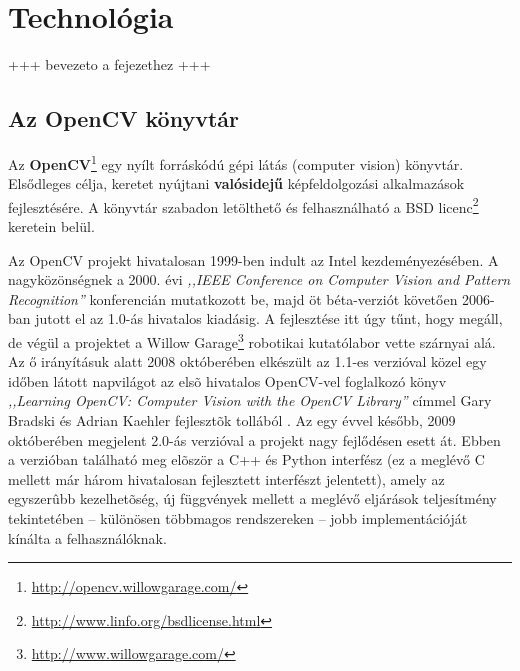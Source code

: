 \chapter{Technológia}\label{sect:technológia}

+++ bevezeto a fejezethez +++

\section{Az OpenCV könyvtár}\label{sect:opencv}

Az \textbf{OpenCV}\footnote{\url{http://opencv.willowgarage.com/}} egy nyílt forráskódú gépi látás (computer vision) könyvtár. Elsődleges célja, keretet nyújtani \textbf{valósidejű} képfeldolgozási alkalmazások fejlesztésére. A könyvtár szabadon letölthető és felhasználható a BSD licenc\footnote{\url{http://www.linfo.org/bsdlicense.html}} keretein belül.

\bigskip

Az OpenCV projekt hivatalosan 1999-ben indult az Intel kezdeményezésében. A nagyközönségnek a 2000. évi \textit{,,IEEE Conference on Computer Vision and Pattern Recognition''} konferencián mutatkozott be, majd öt béta-verziót követően 2006-ban jutott el az 1.0-ás hivatalos kiadásig. A fejlesztése itt úgy tűnt, hogy megáll, de végül a projektet a Willow Garage\footnote{\url{http://www.willowgarage.com/}} robotikai kutatólabor vette szárnyai alá. Az ő irányításuk alatt 2008 októberében elkészült az 1.1-es verzióval közel egy időben látott napvilágot az elsõ hivatalos OpenCV-vel foglalkozó könyv \textit{,,Learning OpenCV: Computer Vision with the OpenCV Library''} címmel Gary Bradski és Adrian Kaehler fejlesztõk tollából \cite{opencv_book}. Az egy évvel később, 2009 októberében megjelent 2.0-ás verzióval a projekt nagy fejlődésen esett át. Ebben a verzióban található meg elõször a C++ és Python interfész (ez a meglévő C mellett már három hivatalosan fejlesztett interfészt jelentett), amely az egyszerûbb kezelhetõség, új függvények mellett a meglévő eljárások teljesítmény tekintetében -- különösen többmagos rendszereken -- jobb implementációját kínálta a felhasználóknak.

\bigskip

